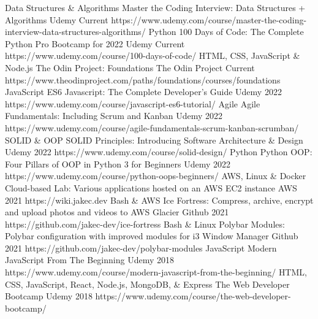 \begin{cvhonors}
  \cvhonor
    {Data Structures \& Algorithms}
    {Master the Coding Interview: Data Structures + Algorithms}
    {Udemy}
    {Current}
    {https://www.udemy.com/course/master-the-coding-interview-data-structures-algorithms/}
  \cvhonor
    {Python}
    {100 Days of Code: The Complete Python Pro Bootcamp for 2022}
    {Udemy}
    {Current}
    {https://www.udemy.com/course/100-days-of-code/}
  \cvhonor
    {HTML, CSS, JavaScript \& Node.js}
    {The Odin Project: Foundations}
    {The Odin Project}
    {Current}
    {https://www.theodinproject.com/paths/foundations/courses/foundations}
  \cvhonor
    {JavaScript}
    {ES6 Javascript: The Complete Developer's Guide}
    {Udemy}
    {2022}
    {https://www.udemy.com/course/javascript-es6-tutorial/}
  \cvhonor
    {Agile}
    {Agile Fundamentals: Including Scrum and Kanban}
    {Udemy}
    {2022}
    {https://www.udemy.com/course/agile-fundamentals-scrum-kanban-scrumban/}
  \cvhonor
    {SOLID \& OOP}
    {SOLID Principles: Introducing Software Architecture \& Design}
    {Udemy}
    {2022}
    {https://www.udemy.com/course/solid-design/}
  \cvhonor
    {Python}
    {Python OOP: Four Pillars of OOP in Python 3 for Beginners}
    {Udemy}
    {2022}
    {https://www.udemy.com/course/python-oops-beginners/}
  \cvhonor
    {AWS, Linux \& Docker}
    {Cloud-based Lab: Various applications hosted on an AWS EC2 instance}
    {AWS}
    {2021}
    {https://wiki.jakec.dev}
  \cvhonor
    {Bash \& AWS}
    {Ice Fortress: Compress, archive, encrypt and upload photos and videos to AWS Glacier}
    {Github}
    {2021}
    {https://github.com/jakec-dev/ice-fortress}
  \cvhonor
    {Bash \& Linux}
    {Polybar Modules: Polybar configuration with improved modules for i3 Window Manager}
    {Github}
    {2021}
    {https://github.com/jakec-dev/polybar-modules}
  \cvhonor
    {JavaScript}
    {Modern JavaScript From The Beginning}
    {Udemy}
    {2018}
    {https://www.udemy.com/course/modern-javascript-from-the-beginning/}
  \cvhonor
    {HTML, CSS, JavaScript, React, Node.js, MongoDB, \& Express}
    {The Web Developer Bootcamp}
    {Udemy}
    {2018}
    {https://www.udemy.com/course/the-web-developer-bootcamp/}
\end{cvhonors}

